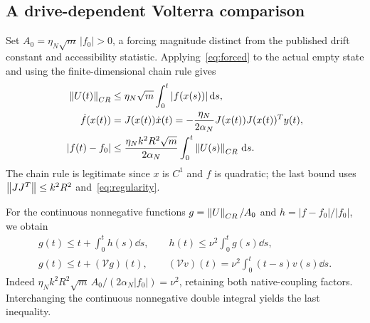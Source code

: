 \subsection{A drive-dependent Volterra comparison}
Set $A_0=\eta_N\sqrt m\,|f_0|>0$, a forcing magnitude distinct from the published drift constant and accessibility statistic. Applying~\eqref{eq:forced} to the actual empty state and using the finite-dimensional chain rule gives
\begin{equation}\label{eq:drivebounds}%
\begin{aligned}
\norm{U(t)}_{CR}&\le\eta_N\sqrt m\int_0^t|f(x(s))|\dd s,\\
\dot f(x(t))&=J(x(t))\dot x(t)
=-\frac{\eta_N}{2\alpha_N}J(x(t))J(x(t))^Ty(t),\\
|f(t)-f_0|&\le
\frac{\eta_N k^2R^2\sqrt m}{2\alpha_N}
\int_0^t\norm{U(s)}_{CR}\dd s.
\end{aligned}
\end{equation}
The chain rule is legitimate since $x$ is $C^1$ and $f$ is quadratic; the last bound uses $\left\|JJ^T\right\|\le k^2R^2$ and~\eqref{eq:regularity}.

For the continuous nonnegative functions $g=\left\|U\right\|_{CR}/A_0$ and $h=|f-f_0|/|f_0|$, we obtain
\begin{equation}\label{eq:volterra}%
\begin{gathered}
g(t)\le t+\int_0^t h(s)\dd s,\qquad
h(t)\le\nu^2\int_0^t g(s)\dd s,\\
g(t)\le t+(\mathcal Vg)(t),\qquad
(\mathcal Vv)(t)=\nu^2\int_0^t(t-s)v(s)\dd s.
\end{gathered}
\end{equation}
Indeed $\eta_Nk^2R^2\sqrt m\,A_0/(2\alpha_N|f_0|)=\nu^2$, retaining both native-coupling factors. Interchanging the continuous nonnegative double integral yields the last inequality.

